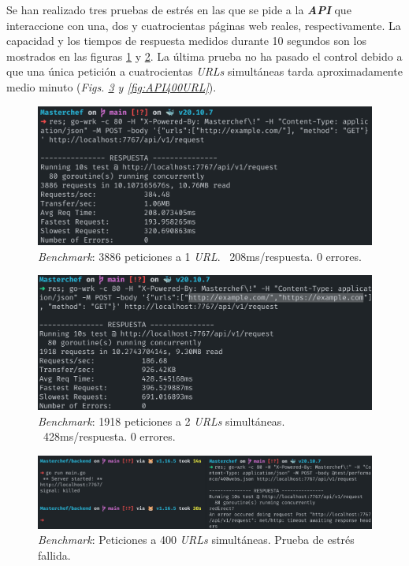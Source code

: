Se han realizado tres pruebas de estrés en las que se pide a la \textit{\textbf{API}} que interaccione con una, dos y cuatrocientas páginas web reales, respectivamente. La capacidad y los tiempos de respuesta medidos durante 10 segundos son los mostrados en las figuras \ref{fig:benchAPI1URL} y \ref{fig:benchAPI2URL}. La última prueba no ha pasado el control debido a que una única petición a cuatrocientas \textit{URLs} simultáneas tarda aproximadamente medio minuto (\textit{Figs. \ref{fig:benchAPI400URL} y \ref{fig:API400URL}}).\sn

\begin{figure}[H]
    \centering
    \includegraphics[width=13cm]{img/tables/28_Bench-API-1URL.png}
    \caption{\textit{Benchmark}: 3886 peticiones a 1 \textit{URL}. ~208ms/respuesta. 0 errores.}
    \label{fig:benchAPI1URL}
\end{figure}

\begin{figure}[H]
    \centering
    \includegraphics[width=13cm]{img/tables/29_Bench-API-2URL.png}
    \caption{\textit{Benchmark}: 1918 peticiones a 2 \textit{URLs} simultáneas. ~428ms/respuesta. 0 errores.}
    \label{fig:benchAPI2URL}
\end{figure}

\begin{figure}[H]
    \centering
    \includegraphics[width=15cm]{img/tables/31_Bench-API-400URL.png}
    \caption{\textit{Benchmark}: Peticiones a 400 \textit{URLs} simultáneas. Prueba de estrés fallida.}
    \label{fig:benchAPI400URL}
\end{figure}

